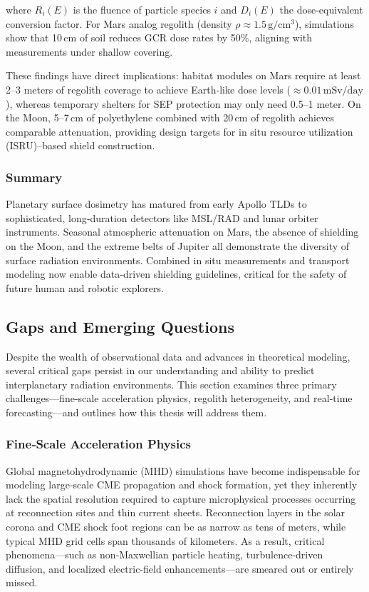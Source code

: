 \documentclass[12pt]{report}
\begin{document}
\noindent where $R_i(E)$ is the fluence of particle species $i$ and $D_i(E)$ the dose‐equivalent conversion factor.  For Mars analog regolith (density $\rho\approx1.5\,\mathrm{g/cm^3}$), simulations show that 10\,cm of soil reduces GCR dose rates by 50\%, aligning with measurements under shallow covering.  

These findings have direct implications:  habitat modules on Mars require at least 2–3 meters of regolith coverage to achieve Earth‐like dose levels ($\approx0.01\,\mathrm{mSv/day}$), whereas temporary shelters for SEP protection may only need 0.5–1 meter.  On the Moon, 5–7\,cm of polyethylene combined with 20\,cm of regolith achieves comparable attenuation, providing design targets for in situ resource utilization (ISRU)–based shield construction.

\subsubsection{Summary}

Planetary surface dosimetry has matured from early Apollo TLDs to sophisticated, long‐duration detectors like MSL/RAD and lunar orbiter instruments.  Seasonal atmospheric attenuation on Mars, the absence of shielding on the Moon, and the extreme belts of Jupiter all demonstrate the diversity of surface radiation environments.  Combined in situ measurements and transport modeling now enable data‐driven shielding guidelines, critical for the safety of future human and robotic explorers.

\subsection{Gaps and Emerging Questions}

Despite the wealth of observational data and advances in theoretical modeling, several critical gaps persist in our understanding and ability to predict interplanetary radiation environments.  This section examines three primary challenges—fine-scale acceleration physics, regolith heterogeneity, and real-time forecasting—and outlines how this thesis will address them.

\subsubsection{Fine‐Scale Acceleration Physics}

Global magnetohydrodynamic (MHD) simulations have become indispensable for modeling large‐scale CME propagation and shock formation, yet they inherently lack the spatial resolution required to capture microphysical processes occurring at reconnection sites and thin current sheets.  Reconnection layers in the solar corona and CME shock foot regions can be as narrow as tens of meters, while typical MHD grid cells span thousands of kilometers.  As a result, critical phenomena—such as non‐Maxwellian particle heating, turbulence‐driven diffusion, and localized electric‐field enhancements—are smeared out or entirely missed.
\end{document}
